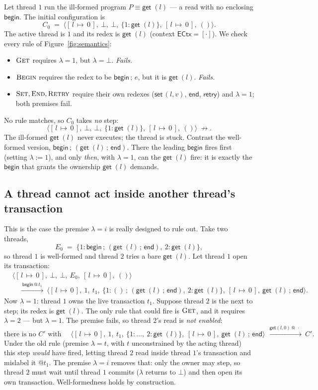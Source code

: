 \documentclass[manuscript,nonacm]{acmart}
\makeatletter
\theoremstyle{acmdefinition}
\newcommand{\unit}{()}
\newcommand{\bbegin}{\textsf{begin}}
\newcommand{\eend}{\textsf{end}}
\newcommand{\retry}{\textsf{retry}}
\newcommand{\getc}[1]{\textsf{get}\;(#1)}
\newcommand{\setc}[2]{\textsf{set}\,(#1,#2)}
\newcommand{\ectx}{\mathsf{ECtx}}
\newcommand{\getev}[3]{\textsf{get}(#1,#2)\,@\,#3}
\newcommand{\st}[1]{[\,l\,{\mapsto}\,#1\,]}          %
\newcommand{\emap}[1]{\{#1\}}                          %
\makeatother
\begin{document}
Let thread $1$ run the ill-formed program $P \equiv \getc{l}$ --- a read with no
enclosing $\bbegin$. The initial configuration is
\[
C_0 \;=\; \langle \st{0},\ \bot,\ \bot,\ \emap{1{:}\getc{l}},\ \st{0},\ \unit\rangle .
\]
The active thread is $1$ and its redex is $\getc{l}$ (context $\ectx=[\cdot]$).
We check every rule of Figure~\ref{fig:semantics}:
\begin{itemize}
\item $\textsc{Get}$ requires $\lambda = 1$, but $\lambda = \bot$. \emph{Fails.}
\item $\textsc{Begin}$ requires the redex to be $\bbegin\,;\,e$, but it is
$\getc{l}$. \emph{Fails.}
\item $\textsc{Set},\textsc{End},\textsc{Retry}$ require their own redexes
($\setc{l}{v}$, $\eend$, $\retry$) and $\lambda = 1$; both premises fail.
\end{itemize}
No rule matches, so $C_0$ takes \emph{no} step:
\[
\langle \st{0},\ \bot,\ \bot,\ \emap{1{:}\getc{l}},\ \st{0},\ \unit\rangle
\ \not\rightarrow .
\]
The ill-formed $\getc{l}$ never executes; the thread is stuck. Contrast the
well-formed version, $\bbegin\,;\,(\getc{l}\,;\,\eend)$. There the leading
$\bbegin$ fires first (setting $\lambda:=1$), and only \emph{then}, with
$\lambda = 1$, can the $\getc{l}$ fire: it is exactly the $\bbegin$ that grants
the ownership $\getc{l}$ demands.

\subsection{A thread cannot act inside another thread's transaction}

This is the case the premise $\lambda = i$ is really designed to rule out. Take
two threads,
\[
E_0 \;=\; \emap{1{:}\bbegin\,;\,(\getc{l}\,;\,\eend),\ 2{:}\getc{l}} ,
\]
so thread $1$ is well-formed and thread $2$ tries a bare $\getc{l}$. Let thread
$1$ open its transaction:
{\small
\[
\begin{aligned}
&\langle \st{0},\ \bot,\ \bot,\ E_0,\ \st{0},\ \unit\rangle\\
&\quad\xrightarrow{\ \bbegin\,@\,t_1\ }\
\langle \st{0},\ 1,\ t_1,\ \emap{1{:}\unit\,;\,(\getc{l}\,;\,\eend),\ 2{:}\getc{l}},\ \st{0},\ \getc{l}\,;\,\eend\rangle .
\end{aligned}
\]}%
Now $\lambda = 1$: thread $1$ owns the live transaction $t_1$. Suppose thread $2$
is the next to step; its redex is $\getc{l}$. The only rule that could
fire is $\textsc{Get}$, and it requires $\lambda = 2$ --- but $\lambda = 1$. The
premise fails, so thread $2$'s read is \emph{not enabled}:
\[
\text{there is no } C' \text{ with }\quad
\langle \st{0},\ 1,\ t_1,\ \emap{1{:}\dots,\ 2{:}\getc{l}},\ \st{0},\ \getc{l}\,;\,\eend\rangle
\ \xrightarrow{\ \getev{l}{0}{\,\cdot\,}\ }\ C' .
\]
Under the old rule (premise $\lambda = t$, with $t$ unconstrained by the acting
thread) this step \emph{would} have fired, letting thread $2$ read inside thread
$1$'s transaction and mislabel it $@t_1$. The premise $\lambda = i$ removes that:
only the owner may step, so thread $2$ must wait until thread $1$ commits
($\lambda$ returns to $\bot$) and then open its own transaction. Well-formedness
holds by construction.
\end{document}
